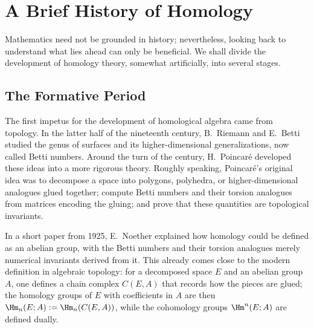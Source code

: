 
\section*{A Brief History of Homology}
\hypertarget{o014.aljabr2.prelude.homology-history}{ }

Mathematics need not be grounded in history; nevertheless, looking back to understand what lies ahead can only be beneficial. We shall divide the development of homology theory, somewhat artificially, into several stages.

\subsection*{The Formative Period}

The first impetus for the development of homological algebra came from topology. In the latter half of the nineteenth century, B.\ Riemann and E.\ Betti studied the genus of surfaces and its higher-dimensional generalizations, now called Betti numbers. Around the turn of the century, H.\ Poincaré developed these ideas into a more rigorous theory. Roughly speaking, Poincaré's original idea was to decompose a space into polygons, polyhedra, or higher-dimensional analogues glued together; compute Betti numbers and their torsion analogues from matrices encoding the gluing; and prove that these quantities are topological invariants.

In a short paper from 1925, E.\ Noether explained how homology could be defined as an abelian group, with the Betti numbers and their torsion analogues merely numerical invariants derived from it. This already comes close to the modern definition in algebraic topology: for a decomposed space $E$ and an abelian group $A$, one defines a chain complex $C(E,A)$ that records how the pieces are glued; the homology groups of $E$ with coefficients in $A$ are then $\Hm_n(E;A):=\Hm_n(C(E,A))$, while the cohomology groups $\Hm^n(E;A)$ are defined dually.

